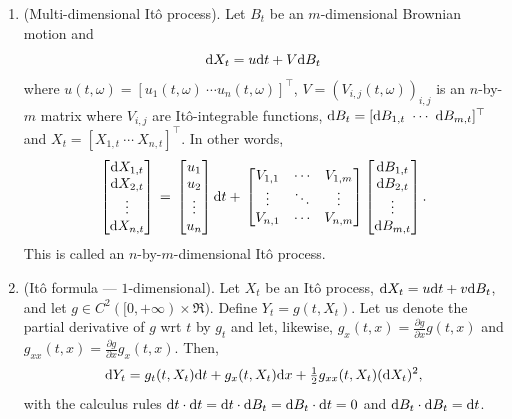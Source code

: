 \documentclass[a4paper,10pt]{scrbook}
\begin{document}
\begin{enumerate}
 \item (Multi-dimensional It\^{o} process).
       Let \(B_t\) be an \(m\)-dimensional Brownian motion and 
       \[
        \mathrm{d} X_t = u \mathrm{d} t + V \mathrm{d} B_t
       \]
       where 
       \(u(t, \omega) = [u_1(t, \omega) ~ \cdots u_n(t, \omega)]^{\top}\), 
       \(V = (V_{i,j}(t, \omega))_{i,j}\) is an \(n\)-by-\(m\) matrix where \(V_{i,j}\) are 
       It\^o-integrable functions,
       \(\mathrm{d} B_t = [\mathrm{d} B_{1,t} ~ \cdots ~ \mathrm{d} B_{m,t}]^{\top}\) and 
       \(X_t = [X_{1,t} ~ \cdots ~ X_{n,t}]^{\top}\).
       In other words,
       \[
        \begin{bmatrix}
         \mathrm{d} X_{1,t} 
         \\ 
         \mathrm{d} X_{2,t} 
         \\
         \vdots 
         \\ 
         \mathrm{d} X_{n,t}
        \end{bmatrix}
        {}={}
        \begin{bmatrix}
         u_1 \\ u_2 \\ \vdots \\ u_n
        \end{bmatrix}
        \mathrm{d} t
        {}+{}
        \begin{bmatrix}
         V_{1,1} & \cdots & V_{1,m}
         \\
         \vdots & \ddots & \vdots 
         \\
         V_{n,1} & \cdots & V_{n,m}
        \end{bmatrix}
        \begin{bmatrix}
         \mathrm{d} B_{1,t} \\ \mathrm{d} B_{2,t} \\ \vdots \\ \mathrm{d} B_{m,t}
        \end{bmatrix}.
       \]
       This is called an \(n\)-by-\(m\)-dimensional It\^{o} process.
       
       
 \item (It\^{o} formula --- \(1\)-dimensional). 
       Let \(X_t\) be an It\^{o} process, \(\mathrm{d} X_t = u \mathrm{d} t + v \mathrm{d} B_t\), and let
       \(g\in C^2([0,+\infty)\times \Re)\). Define \(Y_t = g(t, X_t)\). Let us denote the partial 
       derivative of \(g\) wrt \(t\) by \(g_t\) and let, likewise, \(g_x(t, x) = \frac{\partial g}{\partial x}g(t, x)\)
       and \(g_{xx}(t, x) = \frac{\partial g}{\partial x}g_x(t, x)\). Then,
       \[
        \mathrm{d} Y_t = g_t(t, X_t) \mathrm{d} t 
               + g_x(t, X_t) \mathrm{d} x
               + \tfrac{1}{2} g_{xx}(t, X_t) (\mathrm{d} X_t)^2,
       \]
       with the calculus rules \(\mathrm{d} t \cdot \mathrm{d} t = \mathrm{d} t \cdot \mathrm{d} B_t = \mathrm{d} B_t \cdot \mathrm{d} t = 0\)
       and \(\mathrm{d} B_t \cdot \mathrm{d} B_t = \mathrm{d} t\).
       

\end{enumerate}
\end{document}

